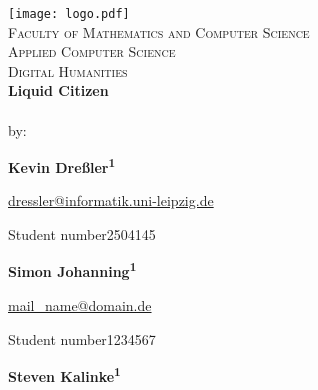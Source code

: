 \begin{titlepage}	%
	\begin{center}
		\libertineOsF
		\vspace*{0.1cm}
		\texttt{[image: logo.pdf]}\\[0.75cm]
		\normalsize{\textsc{Faculty of Mathematics and Computer Science\\Applied Computer Science\\Digital Humanities}}\\[1.25cm]
		\huge{\textbf{Liquid Citizen}}\\[0.75cm]
		\normalsize{\\[1cm]
			by:}
		
	\vspace*{\fill} 
	\begin{minipage}[t]{.6\textwidth}
		\large{\textbf{Kevin Dreßler\textsuperscript{1}}} \vspace*{0.3cm}
		
		\begin{normalsize}
			\href{mailto:dressler@informatik.uni-leipzig.de}{dressler@informatik.uni-leipzig.de} %
			
			\libertineLF
			{\footnotesize Student number\enspace{}2504145} \vspace*{1cm}
		\end{normalsize}
	\end{minipage}%
	\begin{minipage}[t]{.4\textwidth}
		\large{\textbf{Simon Johanning\textsuperscript{1}}} \vspace*{0.3cm}
		
		\begin{normalsize}
			\href{mailto:mail_name@domain.de}{mail\_name@domain.de} %
			
			\libertineLF
			{\footnotesize Student number\enspace{}1234567} \vspace*{1cm}
		\end{normalsize}
	\end{minipage}
		\begin{minipage}[t]{.6\textwidth}
		\large{\textbf{Steven Kalinke\textsuperscript{1}}} \vspace*{0.3cm}
		

\end{minipage}
\end{center}
\end{titlepage}
